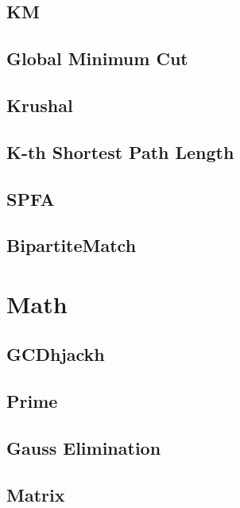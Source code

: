     \subsection{KM}
        
    \subsection{Global Minimum Cut}
        
    \subsection{Krushal}
        
    \subsection{K-th Shortest Path Length}
        
    \subsection{SPFA}
        
    \subsection{BipartiteMatch}
        

\section{Math}
    \subsection{GCDhjackh}
        
    \subsection{Prime}
        
    \subsection{Gauss Elimination}
        
    \subsection{Matrix}
        
